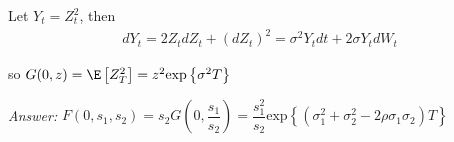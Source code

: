 \noindent Let $Y_t = Z_t^2$, then 
\begin{equation*}
  \begin{gathered}
    dY_t = 2Z_tdZ_t+(dZ_t)^2=\sigma^2Y_tdt+2\sigma Y_tdW_t
  \end{gathered}
\end{equation*}\par
\noindent so $G(0,z) = \E\left[Z_T^2\right] = z^2\text{exp}\left\{\sigma^2T\right\}$
\par\bigskip
\noindent\textit{Answer:} $F(0,s_1,s_2) = s_2G\left(0,\dfrac{s_1}{s_2}\right) = \dfrac{s_1^2}{s_2}\text{exp}\left\{\left(\sigma_1^2+\sigma_2^2-2\rho\sigma_1\sigma_2\right)T\right\}$
